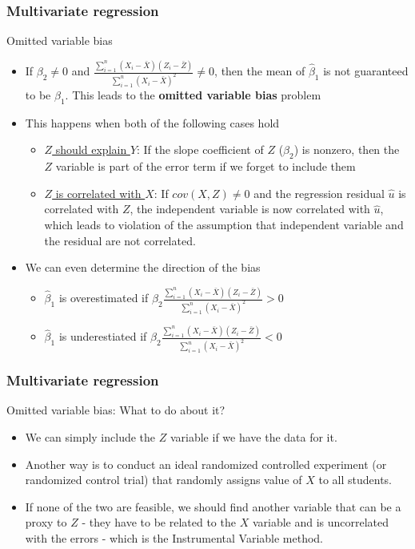 \documentclass[compress]{beamer}
\begin{document}
\begin{frame}
\frametitle{Multivariate regression}
Omitted variable bias
\begin{itemize}
\item If $\beta_2 \neq0$ and $\frac{\sum_{i=1}^n(X_i-\bar{X})(Z_i-\bar{Z})}{\sum_{i=1}^n(X_i-\bar{X})^2}\neq 0$, then the mean of $\hat{\beta}_1$ is not guaranteed to be $\beta_1$. This leads to the \textbf{omitted variable bias} problem
\item This happens when both of the following cases hold
\begin{itemize}
\item \underline{$Z$ should explain $Y$}: If the slope coefficient of $Z$ ($\beta_2$) is nonzero, then the $Z$ variable is part of the error term if we forget to include them
\item \underline{$Z$ is correlated with $X$}: If $cov(X,Z)\neq0$ and the regression residual $\hat{u}$ is correlated with $Z$, the independent variable is now correlated with $\hat{u}$, which leads to violation of the assumption that independent variable and the residual are not correlated.
\end{itemize}
\item We can even determine the direction of the bias
\begin{itemize}
\item $\hat{\beta}_1$ is overestimated if $\beta_2\frac{\sum_{i=1}^n(X_i-\bar{X})(Z_i-\bar{Z})}{\sum_{i=1}^n(X_i-\bar{X})^2}>0$
\item $\hat{\beta}_1$ is underestiated  if $\beta_2\frac{\sum_{i=1}^n(X_i-\bar{X})(Z_i-\bar{Z})}{\sum_{i=1}^n(X_i-\bar{X})^2}<0$
\end{itemize}
\end{itemize}
\end{frame}

\begin{frame}
\frametitle{Multivariate regression}
Omitted variable bias: What to do about it?
\begin{itemize}
\item We can simply include the $Z$ variable if we have the data for it. 
\item Another way is to conduct an ideal randomized controlled experiment (or randomized control trial) that randomly assigns value of $X$ to all students.
\item If none of the two are feasible, we should find another variable that can be a proxy to $Z$ - they have to be related to the $X$ variable and is uncorrelated with the errors - which is the Instrumental Variable method.
\end{itemize}
\end{frame}
\end{document}
